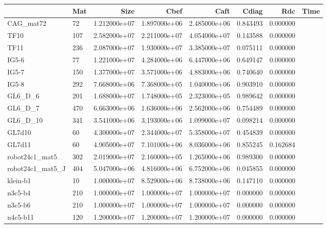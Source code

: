 \begin{tabular}{llrrrrrr}
\toprule
{} &                      Mat &  Size &          Cbef &          Caft &         Cdiag &       Rdc &  Time \\
\midrule
CAG\_mat72               &   72 &  1.212000e+07 &  1.897000e+06 &  2.485000e+06 &  0.843493 &  0.000000 \\
TF10                    &  107 &  2.582000e+07 &  2.211000e+07 &  4.054000e+07 &  0.143588 &  0.000000 \\
TF11                    &  236 &  2.087000e+07 &  1.930000e+07 &  3.385000e+07 &  0.075111 &  0.000000 \\
IG5-6                   &   77 &  1.221000e+07 &  4.284000e+06 &  6.447000e+06 &  0.649147 &  0.000000 \\
IG5-7                   &  150 &  1.377000e+07 &  3.571000e+06 &  4.883000e+06 &  0.740640 &  0.000000 \\
IG5-8                   &  292 &  7.668000e+06 &  7.368000e+05 &  1.040000e+06 &  0.903910 &  0.000000 \\
GL6\_D\_6                 &  201 &  1.688000e+07 &  1.748000e+05 &  2.323000e+05 &  0.989642 &  0.000000 \\
GL6\_D\_7                 &  470 &  6.663000e+06 &  1.636000e+06 &  2.562000e+06 &  0.754489 &  0.000000 \\
GL6\_D\_10                &  341 &  3.541000e+06 &  3.193000e+06 &  1.099000e+07 &  0.098214 &  0.000000 \\
GL7d10                  &   60 &  4.300000e+07 &  2.344000e+07 &  5.358000e+07 &  0.454839 &  0.000000 \\
GL7d11                  &   60 &  4.905000e+07 &  7.101000e+06 &  8.036000e+06 &  0.855245 &  0.162684 \\
robot24c1\_mat5          &  302 &  2.019000e+07 &  2.160000e+05 &  1.265000e+06 &  0.989300 &  0.000000 \\
robot24c1\_mat5\_J        &  404 &  5.047000e+06 &  4.816000e+06 &  6.752000e+06 &  0.045855 &  0.000000 \\
klein-b1                &   10 &  1.000000e+07 &  8.529000e+06 &  8.738000e+06 &  0.147110 &  0.000000 \\
n3c5-b4                 &  210 &  1.000000e+07 &  1.000000e+07 &  1.000000e+07 &  0.000000 &  0.000000 \\
n3c5-b6                 &  210 &  1.000000e+07 &  1.000000e+07 &  1.000000e+07 &  0.000000 &  0.000000 \\
n4c5-b11                &  120 &  1.200000e+07 &  1.200000e+07 &  1.200000e+07 &  0.000000 &  0.000000 \\

\end{tabular}
